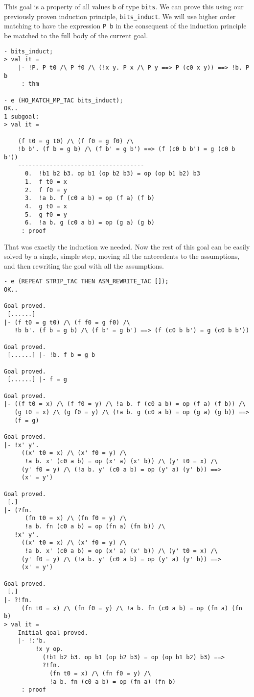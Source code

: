 This goal is a property of all values \texttt{b} of type \texttt{bits}.
We can prove this using our previously proven induction principle,
\texttt{bits\_induct}. We will use higher order matching to have the
expression \texttt{P b} in the consequent of the induction principle
be matched to the full body of the current goal.
%
\begin{session}
\begin{verbatim}
- bits_induct;
> val it =
    |- !P. P t0 /\ P f0 /\ (!x y. P x /\ P y ==> P (c0 x y)) ==> !b. P b
     : thm

- e (HO_MATCH_MP_TAC bits_induct);
OK..
1 subgoal:
> val it =
    
    (f t0 = g t0) /\ (f f0 = g f0) /\
    !b b'. (f b = g b) /\ (f b' = g b') ==> (f (c0 b b') = g (c0 b b'))
    ------------------------------------
      0.  !b1 b2 b3. op b1 (op b2 b3) = op (op b1 b2) b3
      1.  f t0 = x
      2.  f f0 = y
      3.  !a b. f (c0 a b) = op (f a) (f b)
      4.  g t0 = x
      5.  g f0 = y
      6.  !a b. g (c0 a b) = op (g a) (g b)
     : proof
\end{verbatim}
\end{session}

That was exactly the induction we needed. Now the rest of this goal can be
easily solved by a single, simple step, moving all the antecedents to the
assumptions, and then rewriting the goal with all the assumptions.
%
\begin{session}
\begin{verbatim}
- e (REPEAT STRIP_TAC THEN ASM_REWRITE_TAC []);
OK..

Goal proved.
 [......]
|- (f t0 = g t0) /\ (f f0 = g f0) /\
   !b b'. (f b = g b) /\ (f b' = g b') ==> (f (c0 b b') = g (c0 b b'))

Goal proved.
 [......] |- !b. f b = g b

Goal proved.
 [......] |- f = g

Goal proved.
|- ((f t0 = x) /\ (f f0 = y) /\ !a b. f (c0 a b) = op (f a) (f b)) /\
   (g t0 = x) /\ (g f0 = y) /\ (!a b. g (c0 a b) = op (g a) (g b)) ==>
   (f = g)

Goal proved.
|- !x' y'.
     ((x' t0 = x) /\ (x' f0 = y) /\
      !a b. x' (c0 a b) = op (x' a) (x' b)) /\ (y' t0 = x) /\
     (y' f0 = y) /\ (!a b. y' (c0 a b) = op (y' a) (y' b)) ==>
     (x' = y')

Goal proved.
 [.]
|- (?fn.
      (fn t0 = x) /\ (fn f0 = y) /\
      !a b. fn (c0 a b) = op (fn a) (fn b)) /\
   !x' y'.
     ((x' t0 = x) /\ (x' f0 = y) /\
      !a b. x' (c0 a b) = op (x' a) (x' b)) /\ (y' t0 = x) /\
     (y' f0 = y) /\ (!a b. y' (c0 a b) = op (y' a) (y' b)) ==>
     (x' = y')

Goal proved.
 [.]
|- ?!fn.
     (fn t0 = x) /\ (fn f0 = y) /\ !a b. fn (c0 a b) = op (fn a) (fn b)
> val it =
    Initial goal proved.
    |- !:'b.
         !x y op.
           (!b1 b2 b3. op b1 (op b2 b3) = op (op b1 b2) b3) ==>
           ?!fn.
             (fn t0 = x) /\ (fn f0 = y) /\
             !a b. fn (c0 a b) = op (fn a) (fn b)
     : proof
\end{verbatim}
\end{session}

